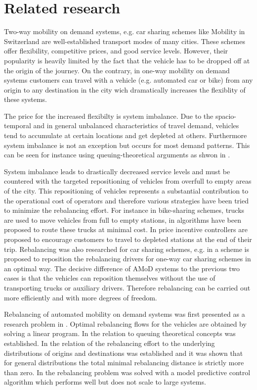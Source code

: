 \section{Related research}
\label{subs:literatureResearch}

Two-way mobility on demand systems, e.g. car sharing schemes like Mobility in
Switzerland \citep{katzev2003car} are well-established transport modes
of many cities. These schemes offer flexibility, competitive prices, and good
service levels. However, their popularity is heavily limited by the fact that
the vehicle has to be dropped off at the origin of the journey. On the contrary,
in one-way mobility on demand systems customers can travel with a vehicle (e.g.
automated car or bike) from any origin to any destination in the city wich
dramatically increases the flexiblity of these systems.

The price for the increased flexibilty is system imbalance. Due to the
spacio-temporal and in general unbalanced characteristics of travel demand,
vehicles tend to accumulate at certain locations and get depleted at others.
Furthermore system imbalance is not an exception but occurs for most demand
patterns. This can be seen for instance using queuing-theoretical arguments
as shwon in \citep{zhang2016control}.

System imbalance leads to drastically decreased service levels and must be
countered with the targeted repositioning of vehicles from overfull to empty
areas of the city. This repositioning of vehicles represents a substantial
contribution to the operational cost of operators and therefore various strategies
have been tried to minimize the rebalancing effort. For instance in bike-sharing
schemes, trucks are used to move vehicles from full to empty stations, in
\citep{pfrommer2014dynamic} algorithms have been proposed to route these
trucks at minimal cost. In \citep{ruch2014rule} price incentive controllers
are proposed to encourage customers to travel to depleted stations at the end
of their trip. Rebalancing was also researched for car sharing schemes, e.g.
in \citep{smith2013rebalancing} a scheme is proposed to reposition the
rebalancing drivers for one-way car sharing schemes in an optimal way. The
decisive difference of AMoD systems to the previous two
cases is that the vehicles can reposition themselves without the use of transporting
trucks or auxiliary drivers. Therefore rebalancing can be carried out more efficiently
and with more degrees of freedom.

Rebalancing of automated mobility on demand systems was first presented as a research
 problem in \citep{pavone2011load}. Optimal rebalancing flows for the vehicles are
 obtained by solving a linear program. In \citep{zhang2016control} the relation to
 queuing theoretical concepts was established. In \citep{treleaven2011asymptotically}
 the relation of the rebalancing effort to the underlying distributions of origins
 and destinations was established and it was shown that for general distributions
 the total minimal rebalancing distance is strictly more than zero.
 In   \citep{zhang2016model} the rebalancing problem was solved with a model
 predictive control algorithm which performs well but does not scale to large systems.

